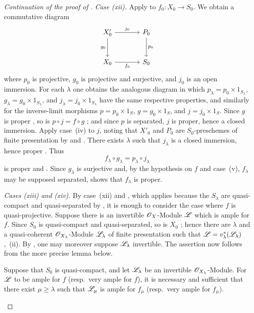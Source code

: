 \begin{proof}[Continuation of the proof of ]
\emph{Case (xii).} Apply  to $f_0:X_0\to S_0$. We obtain a commutative diagram
\[
\begin{tikzcd}[column sep=large,row sep=large]
X'_0 \arrow[r,"j_0"] \arrow[d,"g_0"'] & P_0 \arrow[d,"p_0"] \\
X_0 \arrow[r,"f_0"'] & S_0
\end{tikzcd}
\]
where $p_0$ is projective, $g_0$ is projective and surjective, and $j_0$ is an open immersion. For each $\lambda$ one obtains the analogous diagram in which $p_\lambda=p_0\times1_{S_\lambda}$, $g_\lambda=g_0\times1_{S_\lambda}$, and $j_\lambda=j_0\times1_{S_\lambda}$ have the same respective properties, and similarly for the inverse-limit morphisms $p=p_0\times1_S$, $g=g_0\times1_S$, and $j=j_0\times1_S$. Since $g$ is proper , so is $p\circ j=f\circ g$ ; and since $p$ is separated, $j$ is proper, hence a closed immersion. Apply case~(iv) to $j$, noting that $X'_0$ and $P_0$ are $S_0$-preschemes of finite presentation by  and . There exists $\lambda$ such that $j_\lambda$ is a closed immersion, hence proper . Thus
\[
  f_\lambda\circ g_\lambda=p_\lambda\circ j_\lambda
\]
is proper  and . Since $g_\lambda$ is surjective and, by the hypothesis on $f$ and case~(v), $f_\lambda$ may be supposed separated,  shows that $f_\lambda$ is proper.

\emph{Cases (xiii) and (xiv).} By case~(xii) and , which applies because the $S_\lambda$ are quasi-compact and quasi-separated by , it is enough to consider the case where $f$ is quasi-projective. Suppose there is an invertible $\mathscr{O}_X$-Module $\mathscr{L}$ which is ample for $f$. Since $S_0$ is quasi-compact and quasi-separated, so is $X_0$ ; hence there are $\lambda$ and a quasi-coherent $\mathscr{O}_{X_\lambda}$-Module $\mathscr{L}_\lambda$ of finite presentation such that $\mathscr{L}=v_\lambda^*(\mathscr{L}_\lambda)$ ,~(ii). By , one may moreover suppose $\mathscr{L}_\lambda$ invertible. The assertion now follows from the more precise lemma below.

\begin{lemma}[8.10.5.2]
\label{IV.8.10.5.2}
Suppose that $S_0$ is quasi-compact, and let $\mathscr{L}_\lambda$ be an invertible $\mathscr{O}_{X_\lambda}$-Module. For $\mathscr{L}$ to be ample for $f$ (resp.\ very ample for $f$), it is necessary and sufficient that there exist $\mu\geqslant\lambda$ such that $\mathscr{L}_\mu$ is ample for $f_\mu$ (resp.\ very ample for $f_\mu$).
\end{lemma}


\end{proof}
